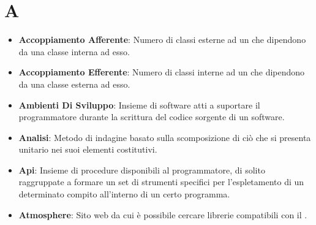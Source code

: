 \section*{A}
\begin{itemize}
	\item
	\textbf{Accoppiamento Afferente}: Numero di classi esterne ad un  che dipendono da una classe interna ad esso.
	\item
	\textbf{Accoppiamento Efferente}: Numero di classi interne ad un  che dipendono da una classe esterna ad esso.
	\item
	\textbf{Ambienti Di Sviluppo}: Insieme di software atti a suportare il programmatore durante la scrittura del codice sorgente di un software.
	\item
	\textbf{Analisi}: Metodo di indagine basato sulla scomposizione di ciò che si presenta unitario nei suoi elementi costitutivi.
	\item
	\textbf{Api}: Insieme di procedure disponibili al programmatore, di solito raggruppate a formare un set di strumenti specifici per l'espletamento di un determinato compito all'interno di un certo programma.
	\item
	\textbf{Atmosphere}: Sito web da cui è possibile cercare librerie compatibili con il  .
\end{itemize}
\newpage
